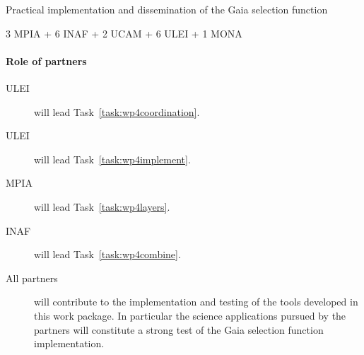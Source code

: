 \begin{workpackage}{Practical implementation and dissemination of the Gaia selection function}
\begin{wpdescription}
{      \textsf{3 MPIA + 6 INAF + 2 UCAM + 6 ULEI + 1 MONA \pems}
    }

    \paragraph{Role of partners}
    \begin{description}
      \item[ULEI] will lead Task~\ref{task:wp4coordination}.
      \item[ULEI] will lead Task~\ref{task:wp4implement}.
      \item[MPIA] will lead Task~\ref{task:wp4layers}.
      \item[INAF] will lead Task~\ref{task:wp4combine}.
      \item[All partners] will contribute to the implementation and testing of the tools developed in this work package. In particular the science applications pursued by the partners will constitute a strong test of the Gaia selection function implementation.
    \end{description}
  \end{wpdescription}

  \begin{wpdeliverables}
    \label{dev:wp4prototypev1}
    \label{dev:wp4prototypev2}
    \label{dev:wp4final}
    \label{dev:wp4portal}
  \end{wpdeliverables}

\end{workpackage}



